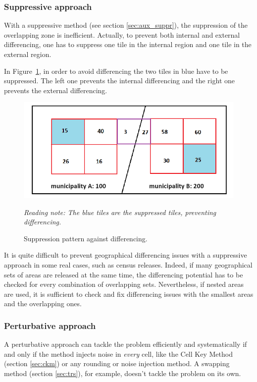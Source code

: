 \subsubsection{Suppressive approach}

With a suppressive method (see section \ref{sec:aux_suppr}), the suppression of the overlapping zone is inefficient. Actually, to prevent both internal and external differencing, one has to suppress one tile in the internal region and one tile in the external region.

In Figure~\ref{fig:prevent}, in order to avoid differencing the two tiles in blue have to be suppressed. The left one prevents the internal differencing and the right one prevents the external differencing.

\begin{figure}[ht]
\centering
\includegraphics[width=0.8\linewidth]{figures/Differencing_issues/prevent_2_en.png}
\caption{Suppression pattern against differencing.}
\vspace{0.15 cm}
\textit{\footnotesize Reading note: The blue tiles are the suppressed tiles, preventing differencing.}
\label{fig:prevent}
\end{figure}

It is quite difficult to prevent geographical differencing issues with a suppressive approach in some real cases, such as census releases. Indeed, if many geographical sets of areas are released at the same time, the differencing potential has to be checked for every combination of overlapping sets. Nevertheless, if nested areas are used, it is sufficient to check and fix differencing issues with the smallest areas and the overlapping ones.

\subsubsection{Perturbative approach}

A perturbative approach can tackle the problem efficiently and systematically if and only if the method injects noise in \emph{every} cell, like the Cell Key Method (section \ref{sec:ckm}) or any rounding or noise injection method. A swapping method (section \ref{sec:trs}), for example, doesn't tackle the problem on its own.
